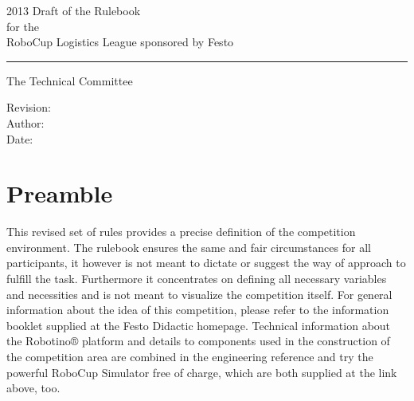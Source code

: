 \documentclass[12pt,twoside]{article}
\begin{document}


\begin{titlepage}
  \vspace*{5cm}
  \begin{center}
    \begin{LARGE}
      2013 Draft of the Rulebook\\[2ex]
      for the\\[2ex]
      RoboCup Logistics League sponsored by Festo\\[4ex]
    \end{LARGE}
    \hrule
    
    \vspace*{4ex}
    \begin{Large}
      The Technical Committee\\[6ex]
    \end{Large}
  \end{center}
  \vspace*{4cm}
  
  \noindent
  Revision: \svnrev\\[2ex]
  Author: \svnauthor\\[2ex]
  Date: \svndate\\[2ex]  
\end{titlepage}
\thispagestyle{empty}
\pagebreak
\cleardoublepage

\setcounter{page}{1}
\tableofcontents
\newpage
\cleardoublepage


\setcounter{page}{1}


\section*{Preamble}

This revised set of rules provides a precise definition of the
competition environment. The rulebook ensures the same and fair
circumstances for all participants, it however is not meant to dictate
or suggest the way of approach to fulfill the task. Furthermore it
concentrates on defining all necessary variables and necessities and
is not meant to visualize the competition itself. For general
information about the idea of this competition, please refer to the
information booklet supplied at the Festo Didactic homepage. Technical
information about the Robotino® platform and details to components
used in the construction of the competition area are combined in the
engineering reference and try the powerful RoboCup Simulator free of
charge, which are both supplied at the link above, too.
\end{document}
